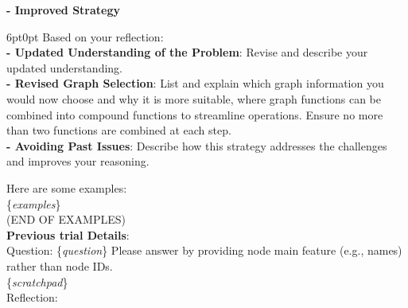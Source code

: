 \documentclass[11pt]{article}
\begin{document}
\begin{tcolorbox}[colback=white!10!white, colframe=blue!30!black, title=, boxrule=1pt]
\textbf{- Improved Strategy}
\begin{adjustwidth}{6pt}{0pt}
 Based on your reflection:\\
  \textbf{- Updated Understanding of the Problem}: Revise and describe your updated understanding.\\
  \textbf{- Revised Graph Selection}: List and explain which graph information you would now choose and why it is more suitable, where graph functions can be combined into compound functions to streamline operations. Ensure no more than two functions are combined at each step.\\
  \textbf{- Avoiding Past Issues}: Describe how this strategy addresses the challenges and improves your reasoning.
\end{adjustwidth}
\end{tcolorbox}

\begin{tcolorbox}[colback=white!10!white, colframe=blue!30!black, title=, boxrule=1pt]
\justifying
\noindent
Here are some examples:\\
\{\textit{examples}\}\\
(END OF EXAMPLES)\\
\textbf{Previous trial Details}:\\
Question: \{\textit{question}\} Please answer by providing node main feature (e.g., names) rather than node IDs.\\
\{\textit{scratchpad}\}\\
Reflection:
\end{tcolorbox}
\end{document}
